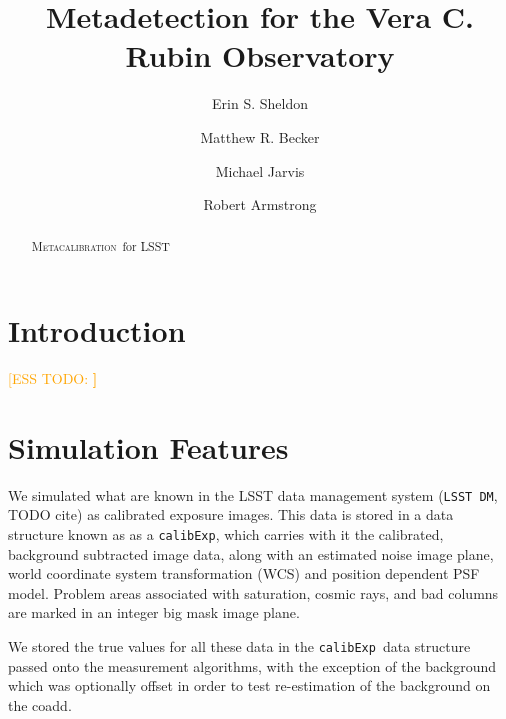 \documentclass[iop, twocolappendix, appendixfloats, numberedappendix, apj]{hackemulateapj}
\newcommand{\esstodo}[1]{\textcolor{orange}{[ESS TODO: \bf #1]}}
\newcommand{\calibexp}{\texttt{calibExp}}
\newcommand{\dm}{\texttt{LSST DM}}
\newcommand{\Mcal}{\textsc{Metacalibration}}
\newcommand{\Mdet}{\textsc{Metadetection}}
\begin{document}



\title{Metadetection for the Vera C. Rubin Observatory}

\author{Erin S. Sheldon}
\author{Matthew R. Becker}
\author{Michael Jarvis}
\author{Robert Armstrong}


\begin{abstract}

    \Mcal\ for LSST

\end{abstract}


\section{Introduction} \label{sec:intro}

\esstodo{}

\section{Simulation Features} \label{sec:sim}

We simulated what are known in the LSST data management system (\dm, TODO cite) as
calibrated exposure images.  This data is stored in a data structure known as
as a \calibexp, which carries with it the calibrated, background subtracted
image data, along with an estimated noise image plane, world coordinate system
transformation (WCS) and position dependent PSF model.  Problem areas
associated with saturation, cosmic rays, and bad columns are marked in an
integer big mask image plane.

We stored the true values for all these data in the \calibexp\ data structure
passed onto the measurement algorithms, with the exception of the background
which was optionally offset in order to test re-estimation of the
background on the coadd.
\end{document}

